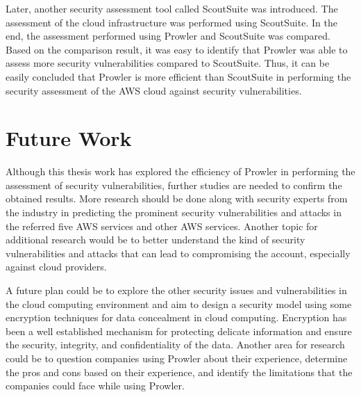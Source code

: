 \par Later, another security assessment tool called ScoutSuite was introduced.
The assessment of the cloud infrastructure was performed using ScoutSuite.
In the end, the assessment performed using Prowler and ScoutSuite was compared.
Based on the comparison result, it was easy to identify that Prowler was able to assess more security vulnerabilities compared to ScoutSuite.
Thus, it can be easily concluded that Prowler is more
efficient than ScoutSuite in performing the security assessment of the AWS cloud against security vulnerabilities.




\section{Future Work}

\par Although this thesis work has explored the efficiency of Prowler in performing the assessment of security vulnerabilities, further studies are needed to confirm the obtained results.
More research should be done along with security experts from the industry in predicting the prominent security vulnerabilities and attacks in the referred five AWS services and other AWS services.
Another topic for additional research would be to better understand the kind of security vulnerabilities and attacks that can lead to compromising the account, especially against cloud providers.

\par A future plan could be to explore the other security issues and vulnerabilities in the cloud computing environment and aim to design a security model using some encryption techniques for data concealment in cloud computing.
Encryption has been a well established mechanism for protecting delicate information and ensure the security, integrity, and confidentiality of the data.
Another area for research could be to question companies using Prowler about their experience, determine
the pros and cons based on their experience, and identify
the limitations that the companies could face while using
Prowler.